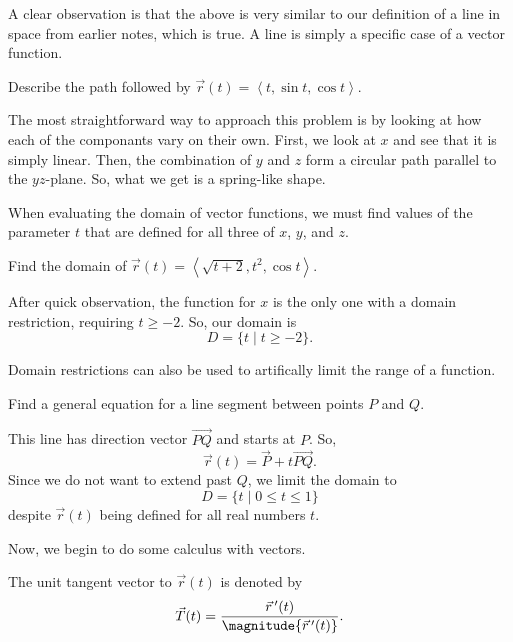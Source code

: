 A clear observation is that the above is very similar to our definition of a line in space from earlier notes, which is true. A line is simply a specific case of a vector function.

\begin{example}
    Describe the path followed by $\vec{r}(t) = \left<t, \sin t, \cos t\right>$.

    \begin{soln}
        The most straightforward way to approach this problem is by looking at how each of the componants vary on their own. First, we look at $x$ and see that it is simply linear. Then, the combination of $y$ and $z$ form a circular path parallel to the $yz$-plane. So, what we get is a spring-like shape.
    \end{soln}
\end{example}

When evaluating the domain of vector functions, we must find values of the parameter $t$ that are defined for all three of $x$, $y$, and $z$.

\begin{example}
    Find the domain of $\vec{r}(t) = \left<\sqrt{t + 2}, t^{2}, \cos t\right>$.

    \begin{soln}
        After quick observation, the function for $x$ is the only one with a domain restriction, requiring $t \geq -2$. So, our domain is
        \[D = \{t \mid t \geq -2\}.\]
    \end{soln}
\end{example}

Domain restrictions can also be used to artifically limit the range of a function.

\begin{example}
    Find a general equation for a line segment between points $P$ and $Q$.

    \begin{soln}
        This line has direction vector $\vec{PQ}$ and starts at $P$. So,
        \[\vec{r}(t) = \vec{P} + t\vec{PQ}.\]
        Since we do not want to extend past $Q$, we limit the domain to
        \[D = \{t \mid 0 \leq t \leq 1\}\]
        despite $\vec{r}(t)$ being defined for all real numbers $t$.
    \end{soln}
\end{example}

Now, we begin to do some calculus with vectors.

\begin{definition}
    The unit tangent vector to $\vec{r}(t)$ is denoted by
    \[\vec{T}(t) = \frac{\ddvec{r}(t)}{\magnitude{\ddvec{r}(t)}}.\]
\end{definition}

